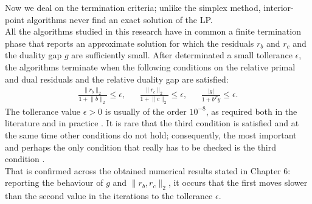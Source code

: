 \documentclass[a4paper,10 pt,titlepage,twoside]{report}
\theoremstyle{plain}
\theoremstyle{definition}
\theoremstyle{remark}
\begin{document}
{{\newpage
Now we deal on the termination criteria; unlike the simplex method, interior-point algorithms never find an exact solution of the LP.\\ All the algorithms studied in this research have in common a finite termination phase that reports an approximate solution for which the residuals $r_{b}$ and $r_{c}$ and the duality gap $g$ are sufficiently small. After determinated a small tollerance $\epsilon$, the algorithms terminate when the following conditions on the relative primal and dual residuals and the relative duality gap are satisfied:
\begin{align}\label{TermC}
\frac{\lVert r_{b}\rVert_{2}}{1+ \lVert b \rVert_{2}}\leq \epsilon, && \frac{\lVert r_{c}\rVert_{2}}{1 + \lVert c \rVert_{2}}\leq \epsilon, &&\frac{|g|}{1+b^{T}y}\leq \epsilon.
\end{align}
The tollerance value $\epsilon > 0$ is usually of the order $10^{-8}$, as required both in the literature and in practice \cite{Wright}. It is rare that the third condition is satisfied and at the same time
other conditions do not hold; consequently, the most important and perhaps
the only condition that really has to be checked is the third condition \cite{ADL}.\\
That is confirmed across the obtained numerical results stated in Chapter 6: reporting the behaviour of $g$ and $\lVert r_{b},r_{c}\rVert_{2}$, it occurs that the first moves slower than the second value in the iterations to the tollerance $\epsilon$.\\
}}
\end{document}
